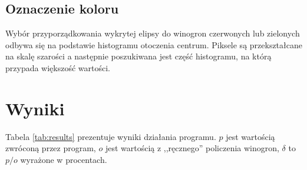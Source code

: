 \documentclass{classrep}
\begin{document}
\subsection{Oznaczenie koloru}
Wybór przyporządkowania wykrytej elipsy do winogron czerwonych lub zielonych odbywa się na podstawie histogramu otoczenia centrum. Piksele są przekształcane na skalę szarości a następnie poszukiwana jest część histogramu, na którą przypada większość wartości.

\section{Wyniki}
Tabela \ref{tab:results} prezentuje wyniki działania programu. $p$ jest wartością zwróconą przez program, $o$ jest wartością z ,,ręcznego'' policzenia winogron, $\delta$ to $p / o$ wyrażone w procentach.
\end{document}

